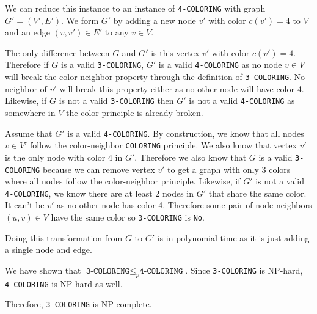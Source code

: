 \documentclass{article}
\begin{document}
We can reduce this instance to an instance of \texttt{4-COLORING} with graph $G' = (V', E')$.
We form $G'$ by adding a new node $v'$ with color $c(v') = 4$ to $V$ and an edge $(v, v') \in E'$ to any $v \in V$.

The only difference between $G$ and $G'$ is this vertex $v'$ with color $c(v') = 4$. 
Therefore if $G$ is a valid \texttt{3-COLORING}, $G'$ is a valid \texttt{4-COLORING} as no node $v \in V$ will break the color-neighbor property through the definition of \texttt{3-COLORING}.
No neighbor of $v'$ will break this property either as no other node will have color 4.
Likewise, if $G$ is not a valid \texttt{3-COLORING} then $G'$ is not a valid \texttt{4-COLORING} as somewhere in $V$ the color principle is already broken.

Assume that $G'$ is a valid \texttt{4-COLORING}. By construction, we know that all nodes $v \in V'$ follow the color-neighbor \texttt{COLORING} principle.
We also know that vertex $v'$ is the only node with color 4 in $G'$. 
Therefore we also know that $G$ is a valid \texttt{3-COLORING} because we can remove vertex $v'$ to get a graph with only 3 colors where all nodes follow the color-neighbor principle.
Likewise, if $G'$ is not a valid \texttt{4-COLORING}, we know there are at least 2 nodes in $G'$ that share the same color. It can't be $v'$ as no other node has color 4.
Therefore some pair of node neighbors $(u, v) \in V$ have the same color so \texttt{3-COLORING} is \texttt{No}.

Doing this transformation from $G$ to $G'$ is in polynomial time as it is just adding a single node and edge.

We have shown that $\texttt{3-COLORING} \leq_p \texttt{4-COLORING}$. Since \texttt{3-COLORING} is NP-hard, \texttt{4-COLORING} is NP-hard as well.

Therefore, \texttt{3-COLORING} is NP-complete.
\end{document}
